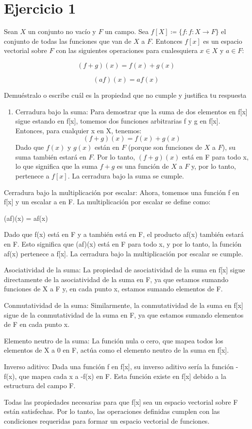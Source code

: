 \section*{Ejercicio 1}

Sean $X$ un conjunto no vacío y $F$ un campo.
Sea $f[X] \coloneqq \{f : f \colon X\to F\}$ el conjunto de todas las funciones que van de $X$ a $F$. Entonces $f[x]$ es un espacio vectorial sobre $F$ con las siguientes operaciones para cualesquiera $x \in X$ y $a \in F$:

$$(f+g)(x) = f(x) + g(x)$$

$$(af)(x) = a f(x)$$


Demuéstralo o escribe cuál es la propiedad que no cumple y justifica tu respuesta

\begin{enumerate}
    \item Cerradura bajo la suma: Para demostrar que la suma de dos elementos en f[x] sigue estando en f[x], tomemos dos funciones arbitrarias f y g en f[x]. Entonces, para cualquier x en X, tenemos:
    $$ (f + g)(x) = f(x) + g(x) $$
    Dado que $f(x)$ y $g(x)$ están en $F$ (porque son funciones de $X$ a $F$), su suma también estará en $F$. Por lo tanto, $(f + g)(x)$ está en F para todo x, lo que significa que la suma $f + g$ es una función de $X$ a $F$ y, por lo tanto, pertenece a $f[x]$. La cerradura bajo la suma se cumple.    
\end{enumerate}



Cerradura bajo la multiplicación por escalar: Ahora, tomemos una función f en f[x] y un escalar a en F. La multiplicación por escalar se define como:

(af)(x) = af(x)

Dado que f(x) está en F y a también está en F, el producto af(x) también estará en F. Esto significa que (af)(x) está en F para todo x, y por lo tanto, la función af(x) pertenece a f[x]. La cerradura bajo la multiplicación por escalar se cumple.

Asociatividad de la suma: La propiedad de asociatividad de la suma en f[x] sigue directamente de la asociatividad de la suma en F, ya que estamos sumando funciones de X a F y, en cada punto x, estamos sumando elementos de F.

Conmutatividad de la suma: Similarmente, la conmutatividad de la suma en f[x] sigue de la conmutatividad de la suma en F, ya que estamos sumando elementos de F en cada punto x.

Elemento neutro de la suma: La función nula o cero, que mapea todos los elementos de X a 0 en F, actúa como el elemento neutro de la suma en f[x].

Inverso aditivo: Dada una función f en f[x], su inverso aditivo sería la función -f(x), que mapea cada x a -f(x) en F. Esta función existe en f[x] debido a la estructura del campo F.

Todas las propiedades necesarias para que f[x] sea un espacio vectorial sobre F están satisfechas. Por lo tanto, las operaciones definidas cumplen con las condiciones requeridas para formar un espacio vectorial de funciones.
